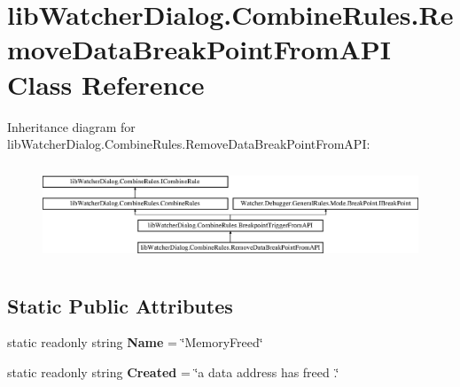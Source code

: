 \hypertarget{classlib_watcher_dialog_1_1_combine_rules_1_1_remove_data_break_point_from_a_p_i}{\section{lib\+Watcher\+Dialog.\+Combine\+Rules.\+Remove\+Data\+Break\+Point\+From\+A\+P\+I Class Reference}
\label{classlib_watcher_dialog_1_1_combine_rules_1_1_remove_data_break_point_from_a_p_i}
}
Inheritance diagram for lib\+Watcher\+Dialog.\+Combine\+Rules.\+Remove\+Data\+Break\+Point\+From\+A\+P\+I\+:\begin{figure}[H]
\begin{center}
\leavevmode
\includegraphics[height=2.909091cm]{classlib_watcher_dialog_1_1_combine_rules_1_1_remove_data_break_point_from_a_p_i}
\end{center}
\end{figure}
\subsection*{Static Public Attributes}
\begin{DoxyCompactItemize}
\item 
\hypertarget{classlib_watcher_dialog_1_1_combine_rules_1_1_remove_data_break_point_from_a_p_i_ae20cd0bc0a46eb360d37adb81c220aa3}{static readonly string {\bfseries Name} = \char`\"{}Memory\+Freed\char`\"{}}\label{classlib_watcher_dialog_1_1_combine_rules_1_1_remove_data_break_point_from_a_p_i_ae20cd0bc0a46eb360d37adb81c220aa3}

\item 
\hypertarget{classlib_watcher_dialog_1_1_combine_rules_1_1_remove_data_break_point_from_a_p_i_ad10b73d902f5f43b0d8e024538161937}{static readonly string {\bfseries Created} = \char`\"{}a data address has freed .\char`\"{}}\label{classlib_watcher_dialog_1_1_combine_rules_1_1_remove_data_break_point_from_a_p_i_ad10b73d902f5f43b0d8e024538161937}

\end{DoxyCompactItemize}

